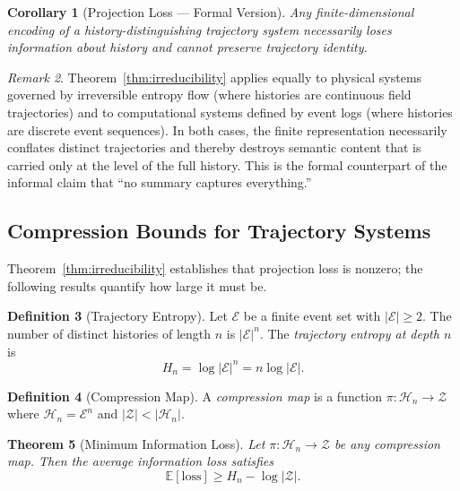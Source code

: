 \documentclass[12pt, twoside]{article}
\theoremstyle{plain}
\newtheorem{theorem}{Theorem}[section]
\newtheorem{corollary}[theorem]{Corollary}
\theoremstyle{definition}
\newtheorem{definition}[theorem]{Definition}
\theoremstyle{remark}
\newtheorem{remark}[theorem]{Remark}
\begin{document}
\begin{corollary}[Projection Loss — Formal Version]
\label{cor:projloss-formal}
Any finite-dimensional encoding of a history-distinguishing
trajectory system necessarily loses information about history
and cannot preserve trajectory identity.
\end{corollary}

\begin{remark}
Theorem~\ref{thm:irreducibility} applies equally to physical
systems governed by irreversible entropy flow (where histories are
continuous field trajectories) and to computational systems defined
by event logs (where histories are discrete event sequences).
In both cases, the finite representation necessarily conflates
distinct trajectories and thereby destroys semantic content
that is carried only at the level of the full history.
This is the formal counterpart of the informal claim that
``no summary captures everything.''
\end{remark}

\subsection{Compression Bounds for Trajectory Systems}

Theorem~\ref{thm:irreducibility} establishes that projection loss
is nonzero; the following results quantify how large it must be.

\begin{definition}[Trajectory Entropy]
Let $\mathcal{E}$ be a finite event set with $|\mathcal{E}| \geq 2$.
The number of distinct histories of length $n$ is $|\mathcal{E}|^n$.
The \emph{trajectory entropy at depth $n$} is
\[
  H_n = \log |\mathcal{E}|^n = n \log |\mathcal{E}|.
\]
\end{definition}

\begin{definition}[Compression Map]
A \emph{compression map} is a function
$\pi: \mathcal{H}_n \to \mathcal{Z}$
where $\mathcal{H}_n = \mathcal{E}^n$ and $|\mathcal{Z}| < |\mathcal{H}_n|$.
\end{definition}

\begin{theorem}[Minimum Information Loss]
\label{thm:minloss}
Let $\pi: \mathcal{H}_n \to \mathcal{Z}$ be any compression map.
Then the average information loss satisfies
\[
  \mathbb{E}[\mathrm{loss}] \geq H_n - \log |\mathcal{Z}|.
\]
\end{theorem}
\end{document}
